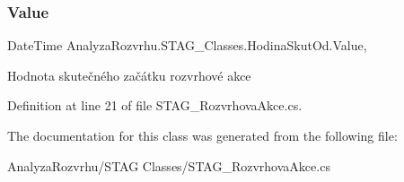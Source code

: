 \subsubsection{\texorpdfstring{Value}{Value}}
{\footnotesize\ttfamily Date\+Time Analyza\+Rozvrhu.\+S\+T\+A\+G\+\_\+\+Classes.\+Hodina\+Skut\+Od.\+Value\hspace{0.3cm}{\ttfamily [get]}, {\ttfamily [set]}}



Hodnota skutečného začátku rozvrhové akce 



Definition at line 21 of file S\+T\+A\+G\+\_\+\+Rozvrhova\+Akce.\+cs.



The documentation for this class was generated from the following file\+:\begin{DoxyCompactItemize}
\item 
Analyza\+Rozvrhu/\+S\+T\+A\+G Classes/S\+T\+A\+G\+\_\+\+Rozvrhova\+Akce.\+cs\end{DoxyCompactItemize}
